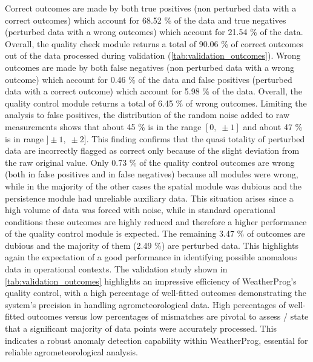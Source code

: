 \documentclass[authoryear,preprint,review,12pt]{elsarticle}
\begin{document}
Correct outcomes are made by both true positives (non perturbed data with a correct outcomes) which account for 68.52 \% of the data and true negatives (perturbed data with a wrong outcomes) which account for 21.54 \% of the data. Overall, the quality check module returns a total of 90.06 \% of correct outcomes out of the data processed during validation (\cref{tab:validation_outcomes}).
Wrong outcomes are made by both false negatives (non perturbed data with a wrong outcome) which account for 0.46 \% of the data and false positives (perturbed data with a correct outcome) which account for 5.98 \% of the data. Overall, the quality control module returns a total of 6.45 \% of wrong outcomes. Limiting the analysis to false positives, the distribution of the random noise added to raw measurements shows that about 45 \% is in the range $[0,\; \pm1]$ and about 47 \% is in range $]\pm1,\; \pm2]$. This finding confirms that the quasi totality of perturbed data are incorrectly flagged as correct only because of the slight deviation from the raw original value.
Only 0.73 \% of the quality control outcomes are wrong (both in false positives and in false negatives) because all modules were wrong, while in the majority of the other cases the spatial module was dubious and the persistence module had unreliable auxiliary data. This situation arises since a high volume of data was forced with noise, while in standard operational conditions these outcomes are highly reduced and therefore a higher performance of the quality control module is expected.
The remaining 3.47 \% of outcomes are dubious and the majority of them (2.49 \%) are perturbed data. This highlights again the expectation of a good performance in identifying possible anomalous data in operational contexts.
The validation study shown in \cref{tab:validation_outcomes} highlights an impressive efficiency of WeatherProg's quality control, with a high percentage of well-fitted outcomes demonstrating the system's precision in handling agrometeorological data. High percentages of well-fitted outcomes versus low percentages of mismatches are pivotal to assess / state that a significant majority of data points were accurately processed. This indicates a robust anomaly detection capability within WeatherProg, essential for reliable agrometeorological analysis.
\end{document}
